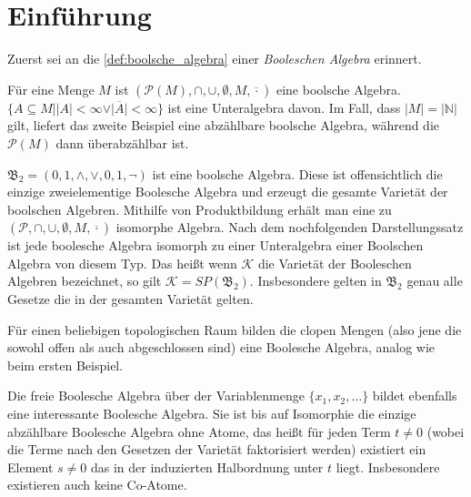 \section{Einführung}

Zuerst sei an die \cref{def:boolsche_algebra} einer \emph{Booleschen Algebra} erinnert.

\begin{example}
    Für eine Menge $M$ ist $(\mathcal{P}(M), \cap, \cup, \emptyset, M, \overline{\cdot})$ eine boolsche Algebra. $\{A \subseteq M \mid \vert A\vert < \infty \lor \vert \overline{A} \vert < \infty\}$ ist eine Unteralgebra davon. Im Fall, dass $|M|=|\mathbb{N}|$ gilt, liefert das zweite Beispiel eine abzählbare boolsche Algebra, während die $\mathcal{P}(M)$ dann überabzählbar ist.
\end{example}
\begin{example}
    $\mathfrak{B}_2 = ({0,1}, \land, \lor, 0, 1, \lnot)$ ist eine boolsche Algebra. Diese ist offensichtlich die einzige zweielementige Boolesche Algebra und erzeugt die gesamte Varietät der boolschen Algebren. Mithilfe von Produktbildung erhält man eine zu $(\mathcal{P},\cap,\cup,\emptyset,M,\overline{\cdot})$ isomorphe Algebra. Nach dem nochfolgenden Darstellungssatz ist jede boolesche Algebra isomorph zu einer Unteralgebra einer Boolschen Algebra von diesem Typ. Das heißt wenn $\mathcal{K}$ die Varietät der Booleschen Algebren bezeichnet, so gilt $\mathcal{K}=SP(\mathfrak{B}_2)$. Insbesondere gelten in $\mathfrak{B}_2$ genau alle Gesetze die in der gesamten Varietät gelten.
\end{example}

\begin{example}
    Für einen beliebigen topologischen Raum bilden die clopen Mengen (also jene die sowohl offen als auch abgeschlossen sind) eine Boolesche Algebra, analog wie beim ersten Beispiel.
\end{example}

\begin{example}
    Die freie Boolesche Algebra über der Variablenmenge $\{x_1,x_2,\ldots\}$ bildet ebenfalls eine interessante Boolesche Algebra. Sie ist bis auf Isomorphie die einzige abzählbare Boolesche Algebra ohne Atome, das heißt für jeden Term $t\neq 0$ (wobei die Terme nach den Gesetzen der Varietät faktorisiert werden) existiert ein Element $s\neq 0$ das in der induzierten Halbordnung unter $t$ liegt. Insbesondere existieren auch keine Co-Atome.
\end{example}

